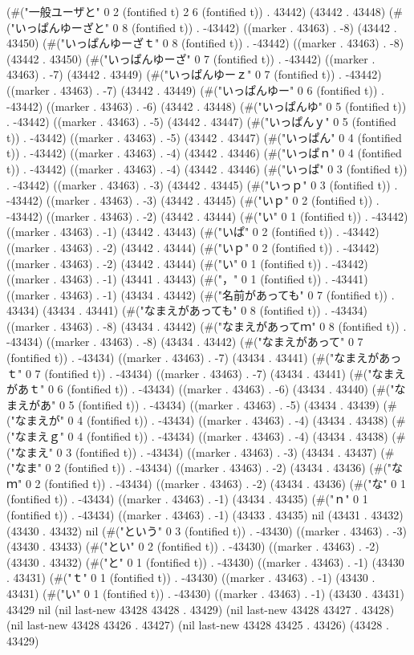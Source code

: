 (#("一般ユーザと" 0 2 (fontified t) 2 6 (fontified t)) . 43442) (43442 . 43448) (#("いっぱんゆーざと" 0 8 (fontified t)) . -43442) ((marker . 43463) . -8) (43442 . 43450) (#("いっぱんゆーざｔ" 0 8 (fontified t)) . -43442) ((marker . 43463) . -8) (43442 . 43450) (#("いっぱんゆーざ" 0 7 (fontified t)) . -43442) ((marker . 43463) . -7) (43442 . 43449) (#("いっぱんゆーｚ" 0 7 (fontified t)) . -43442) ((marker . 43463) . -7) (43442 . 43449) (#("いっぱんゆー" 0 6 (fontified t)) . -43442) ((marker . 43463) . -6) (43442 . 43448) (#("いっぱんゆ" 0 5 (fontified t)) . -43442) ((marker . 43463) . -5) (43442 . 43447) (#("いっぱんｙ" 0 5 (fontified t)) . -43442) ((marker . 43463) . -5) (43442 . 43447) (#("いっぱん" 0 4 (fontified t)) . -43442) ((marker . 43463) . -4) (43442 . 43446) (#("いっぱｎ" 0 4 (fontified t)) . -43442) ((marker . 43463) . -4) (43442 . 43446) (#("いっぱ" 0 3 (fontified t)) . -43442) ((marker . 43463) . -3) (43442 . 43445) (#("いっｐ" 0 3 (fontified t)) . -43442) ((marker . 43463) . -3) (43442 . 43445) (#("いｐ" 0 2 (fontified t)) . -43442) ((marker . 43463) . -2) (43442 . 43444) (#("い" 0 1 (fontified t)) . -43442) ((marker . 43463) . -1) (43442 . 43443) (#("いぱ" 0 2 (fontified t)) . -43442) ((marker . 43463) . -2) (43442 . 43444) (#("いｐ" 0 2 (fontified t)) . -43442) ((marker . 43463) . -2) (43442 . 43444) (#("い" 0 1 (fontified t)) . -43442) ((marker . 43463) . -1) (43441 . 43443) (#("，" 0 1 (fontified t)) . -43441) ((marker . 43463) . -1) (43434 . 43442) (#("名前があっても" 0 7 (fontified t)) . 43434) (43434 . 43441) (#("なまえがあっても" 0 8 (fontified t)) . -43434) ((marker . 43463) . -8) (43434 . 43442) (#("なまえがあってｍ" 0 8 (fontified t)) . -43434) ((marker . 43463) . -8) (43434 . 43442) (#("なまえがあって" 0 7 (fontified t)) . -43434) ((marker . 43463) . -7) (43434 . 43441) (#("なまえがあっｔ" 0 7 (fontified t)) . -43434) ((marker . 43463) . -7) (43434 . 43441) (#("なまえがあｔ" 0 6 (fontified t)) . -43434) ((marker . 43463) . -6) (43434 . 43440) (#("なまえがあ" 0 5 (fontified t)) . -43434) ((marker . 43463) . -5) (43434 . 43439) (#("なまえが" 0 4 (fontified t)) . -43434) ((marker . 43463) . -4) (43434 . 43438) (#("なまえｇ" 0 4 (fontified t)) . -43434) ((marker . 43463) . -4) (43434 . 43438) (#("なまえ" 0 3 (fontified t)) . -43434) ((marker . 43463) . -3) (43434 . 43437) (#("なま" 0 2 (fontified t)) . -43434) ((marker . 43463) . -2) (43434 . 43436) (#("なｍ" 0 2 (fontified t)) . -43434) ((marker . 43463) . -2) (43434 . 43436) (#("な" 0 1 (fontified t)) . -43434) ((marker . 43463) . -1) (43434 . 43435) (#("ｎ" 0 1 (fontified t)) . -43434) ((marker . 43463) . -1) (43433 . 43435) nil (43431 . 43432) (43430 . 43432) nil (#("という" 0 3 (fontified t)) . -43430) ((marker . 43463) . -3) (43430 . 43433) (#("とい" 0 2 (fontified t)) . -43430) ((marker . 43463) . -2) (43430 . 43432) (#("と" 0 1 (fontified t)) . -43430) ((marker . 43463) . -1) (43430 . 43431) (#("ｔ" 0 1 (fontified t)) . -43430) ((marker . 43463) . -1) (43430 . 43431) (#("い" 0 1 (fontified t)) . -43430) ((marker . 43463) . -1) (43430 . 43431) 43429 nil (nil last-new 43428 43428 . 43429) (nil last-new 43428 43427 . 43428) (nil last-new 43428 43426 . 43427) (nil last-new 43428 43425 . 43426) (43428 . 43429) 